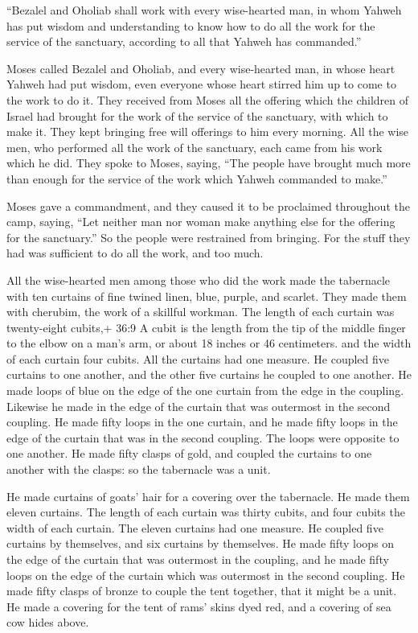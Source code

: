  ``Bezalel and Oholiab shall work with every wise-hearted
man, in whom Yahweh has put wisdom and understanding to know how to do
all the work for the service of the sanctuary, according to all that
Yahweh has commanded.''

 Moses called Bezalel and Oholiab, and every wise-hearted
man, in whose heart Yahweh had put wisdom, even everyone whose heart
stirred him up to come to the work to do it.  They received
from Moses all the offering which the children of Israel had brought for
the work of the service of the sanctuary, with which to make it. They
kept bringing free will offerings to him every morning.  All
the wise men, who performed all the work of the sanctuary, each came
from his work which he did.  They spoke to Moses, saying,
``The people have brought much more than enough for the service of the
work which Yahweh commanded to make.''

 Moses gave a commandment, and they caused it to be
proclaimed throughout the camp, saying, ``Let neither man nor woman make
anything else for the offering for the sanctuary.'' So the people were
restrained from bringing.  For the stuff they had was
sufficient to do all the work, and too much.

 All the wise-hearted men among those who did the work made
the tabernacle with ten curtains of fine twined linen, blue, purple, and
scarlet. They made them with cherubim, the work of a skillful workman.
 The length of each curtain was twenty-eight cubits,+ 36:9 A
cubit is the length from the tip of the middle finger to the elbow on a
man's arm, or about 18 inches or 46 centimeters. and the width of each
curtain four cubits. All the curtains had one measure.  He
coupled five curtains to one another, and the other five curtains he
coupled to one another.  He made loops of blue on the edge
of the one curtain from the edge in the coupling. Likewise he made in
the edge of the curtain that was outermost in the second coupling.
 He made fifty loops in the one curtain, and he made fifty
loops in the edge of the curtain that was in the second coupling. The
loops were opposite to one another.  He made fifty clasps
of gold, and coupled the curtains to one another with the clasps: so the
tabernacle was a unit.

 He made curtains of goats' hair for a covering over the
tabernacle. He made them eleven curtains.  The length of
each curtain was thirty cubits, and four cubits the width of each
curtain. The eleven curtains had one measure.  He coupled
five curtains by themselves, and six curtains by themselves.
 He made fifty loops on the edge of the curtain that was
outermost in the coupling, and he made fifty loops on the edge of the
curtain which was outermost in the second coupling.  He
made fifty clasps of bronze to couple the tent together, that it might
be a unit.  He made a covering for the tent of rams' skins
dyed red, and a covering of sea cow hides above.

